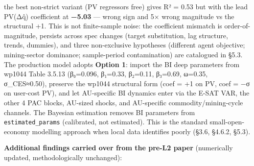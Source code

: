\documentclass[
]{article}
\begin{document}
\begin{enumerate}
  the best non-strict variant (PV regressors free) gives R² = 0.53 but
  with the lead PV(Δq̂) coefficient at \textbf{−5.03} --- wrong sign and
  5× wrong magnitude vs the structural +1. This is not finite-sample
  noise: the coefficient mismatch is order-of-magnitude, persists across
  spec changes (target substitution, lag structure, trends, dummies),
  and three non-exclusive hypotheses (different agent objective;
  mining-sector dominance; sample-period contamination) are catalogued
  in §5.3. The production model adopts \textbf{Option 1}: import the BI
  deep parameters from wp1044 Table 3.5.13 (β₀=0.096, β₁=0.33, β₂=0.11,
  β₃=0.69, ω=0.35, σ\_CES≈0.50), preserve the wp1044 structural form
  (coef = +1 on PV, coef = −σ on user-cost PV), and let AU-specific BI
  dynamics enter via the E-SAT VAR, the other 4 PAC blocks, AU-sized
  shocks, and AU-specific commodity/mining-cycle channels. The Bayesian
  estimation removes BI parameters from \texttt{estimated\_params}
  (calibrated, not estimated). This is the standard small-open-economy
  modelling approach when local data identifies poorly (§3.6, §4.6.2,
  §5.3).
\end{enumerate}

\textbf{Additional findings carried over from the pre-L2 paper}
(numerically updated, methodologically unchanged):
\end{document}
